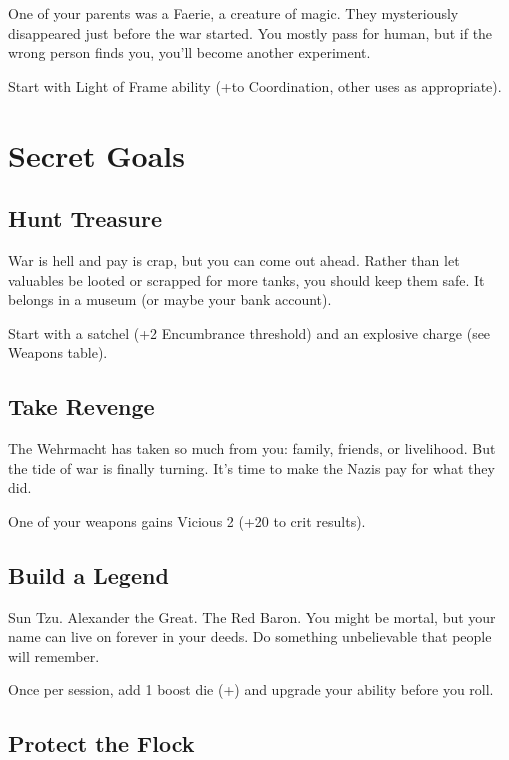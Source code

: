 \documentclass{book}
\newcommand{\bbb}{\BoostDie }
\begin{document}
\begin{multicols}{2}
One of your parents was a Faerie, a creature of magic.  They mysteriously disappeared just before the war started.  You mostly pass for human, but if the wrong person finds you, you'll become another experiment.

Start with Light of Frame ability (+\bbb to Coordination, other uses as appropriate).

\section{Secret Goals}

\subsection{Hunt Treasure}

War is hell and pay is crap, but you can come out ahead.  Rather than let valuables be looted or scrapped for more tanks, you should keep them safe.  It belongs in a museum (or maybe your bank account).

Start with a satchel (+2 Encumbrance threshold) and an explosive charge (see Weapons table). 


\subsection{Take Revenge}

The Wehrmacht has taken so much from you: family, friends, or livelihood.  But the tide of war is finally turning.  It's time to make the Nazis pay for what they did.

One of your weapons gains Vicious 2 (+20 to crit results).

\subsection{Build a Legend}

Sun Tzu.  Alexander the Great.  The Red Baron.  You might be mortal, but your name can live on forever in your deeds.  Do something unbelievable that people will remember.

Once per session, add 1 boost die (+\bbb) and upgrade your ability before you roll.

\subsection{Protect the Flock}


\end{multicols}
\end{document}
